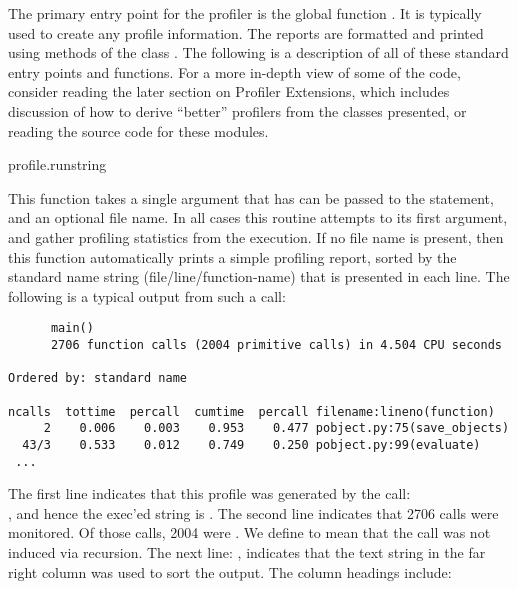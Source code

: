 \renewcommand{\indexsubitem}{(profiler function)}

The primary entry point for the profiler is the global function
.  It is typically used to create any profile
information.  The reports are formatted and printed using methods of
the class .  The following is a description of all
of these standard entry points and functions.  For a more in-depth
view of some of the code, consider reading the later section on
Profiler Extensions, which includes discussion of how to derive
``better'' profilers from the classes presented, or reading the source
code for these modules.

\begin{funcdesc}{profile.run}{string}

This function takes a single argument that has can be passed to the
 statement, and an optional file name.  In all cases this
routine attempts to  its first argument, and gather profiling
statistics from the execution. If no file name is present, then this
function automatically prints a simple profiling report, sorted by the
standard name string (file/line/function-name) that is presented in
each line.  The following is a typical output from such a call:

\bcode\begin{verbatim}
      main()
      2706 function calls (2004 primitive calls) in 4.504 CPU seconds

Ordered by: standard name

ncalls  tottime  percall  cumtime  percall filename:lineno(function)
     2    0.006    0.003    0.953    0.477 pobject.py:75(save_objects)
  43/3    0.533    0.012    0.749    0.250 pobject.py:99(evaluate)
 ...
\end{verbatim}\ecode

The first line indicates that this profile was generated by the call:\\
, and hence the exec'ed string is
.  The second line indicates that 2706 calls were
monitored.  Of those calls, 2004 were .  We define
 to mean that the call was not induced via recursion.
The next line: , indicates that
the text string in the far right column was used to sort the output.
The column headings include:

\begin{description}


\end{description}
\end{funcdesc}
